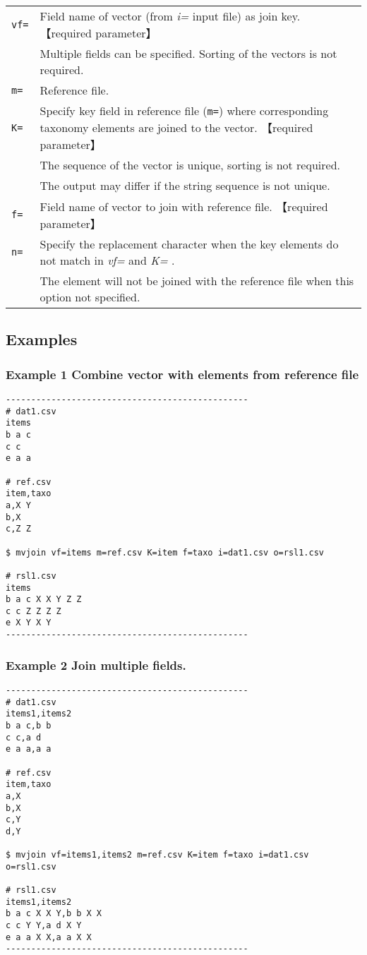 \documentclass[a4paper]{jarticle}
\begin{document}
\begin{table}[htbp]
{\small
\begin{tabular}{ll}
\verb|vf=| & Field name of vector (from \emph{i=} input file) as join key. 【required parameter】\\
           & Multiple fields can be specified. Sorting of the vectors is not required. \\
\verb|m=|  & Reference file. \\
\verb|K=|  &  Specify key field in reference file (\verb|m=|) where corresponding taxonomy elements are joined to the vector. 【required parameter】 \\
           & The sequence of the vector is unique, sorting is not required. \\
           & The output may differ if the string sequence is not unique. \\
\verb|f=|  &  Field name of vector to join with reference file. 【required parameter】\\
\verb|n=|  & Specify the replacement character when the key elements do not match in \emph{vf=} and \emph{K=} . \\
& The element will not be joined with the reference file when this option not specified.  \\
\end{tabular}
}
\end{table} 

\subsection*{Examples}
\subsubsection*{Example 1 Combine vector with elements from reference file }
\begin{verbatim}
------------------------------------------------
# dat1.csv
items
b a c
c c
e a a

# ref.csv
item,taxo
a,X Y
b,X
c,Z Z

$ mvjoin vf=items m=ref.csv K=item f=taxo i=dat1.csv o=rsl1.csv

# rsl1.csv
items
b a c X X Y Z Z
c c Z Z Z Z
e X Y X Y
------------------------------------------------
\end{verbatim}

\subsubsection*{Example 2 Join multiple fields.  }
\begin{verbatim}
------------------------------------------------
# dat1.csv
items1,items2
b a c,b b
c c,a d
e a a,a a

# ref.csv
item,taxo
a,X
b,X
c,Y
d,Y

$ mvjoin vf=items1,items2 m=ref.csv K=item f=taxo i=dat1.csv o=rsl1.csv

# rsl1.csv
items1,items2
b a c X X Y,b b X X
c c Y Y,a d X Y
e a a X X,a a X X
------------------------------------------------
\end{verbatim}
\end{document}
